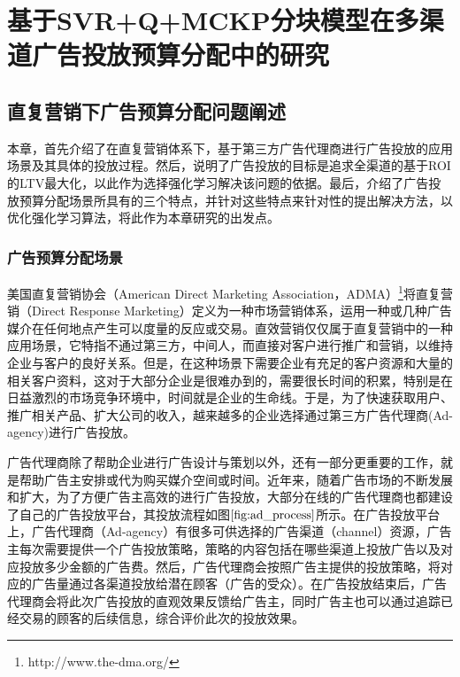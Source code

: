 \chapter{基于SVR+Q+MCKP分块模型在多渠道广告投放预算分配中的研究}


\section{直复营销下广告预算分配问题阐述}
本章，首先介绍了在直复营销体系下，基于第三方广告代理商进行广告投放的应用场景及其具体的投放过程。然后，说明了广告投放的目标是追求全渠道的基于ROI的LTV最大化，以此作为选择强化学习解决该问题的依据。最后，介绍了广告投放预算分配场景所具有的三个特点，并针对这些特点来针对性的提出解决方法，以优化强化学习算法，将此作为本章研究的出发点。

\subsection{广告预算分配场景}
美国直复营销协会（American Direct Marketing Association，ADMA）\footnote{http://www.the-dma.org/}将直复营销（Direct Response Marketing）定义为一种市场营销体系，运用一种或几种广告媒介在任何地点产生可以度量的反应或交易。直效营销仅仅属于直复营销中的一种应用场景，它特指不通过第三方，中间人，而直接对客户进行推广和营销，以维持企业与客户的良好关系。但是，在这种场景下需要企业有充足的客户资源和大量的相关客户资料，这对于大部分企业是很难办到的，需要很长时间的积累，特别是在日益激烈的市场竞争环境中，时间就是企业的生命线。于是，为了快速获取用户、推广相关产品、扩大公司的收入，越来越多的企业选择通过第三方广告代理商(Ad-agency)进行广告投放。

广告代理商除了帮助企业进行广告设计与策划以外，还有一部分更重要的工作，就是帮助广告主安排或代为购买媒介空间或时间。近年来，随着广告市场的不断发展和扩大，为了方便广告主高效的进行广告投放，大部分在线的广告代理商也都建设了自己的广告投放平台，其投放流程如图$\ref{fig:ad_process}$所示。在广告投放平台上，广告代理商（Ad-agency）有很多可供选择的广告渠道（channel）资源，广告主每次需要提供一个广告投放策略，策略的内容包括在哪些渠道上投放广告以及对应投放多少金额的广告费。然后，广告代理商会按照广告主提供的投放策略，将对应的广告量通过各渠道投放给潜在顾客（广告的受众）。在广告投放结束后，广告代理商会将此次广告投放的直观效果反馈给广告主，同时广告主也可以通过追踪已经交易的顾客的后续信息，综合评价此次的投放效果。

